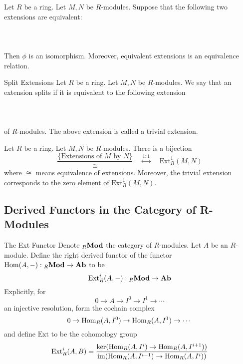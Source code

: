 \documentclass[a4paper]{article}
\begin{document}
\begin{prp}{}{} Let $R$ be a ring. Let $M,N$ be $R$-modules. Suppose that the following two extensions are equivalent: \\~\\
 \\~\\
Then $\phi$ is an isomorphism. Moreover, equivalent extensions is an equivalence relation. 
\end{prp}

\begin{defn}{Split Extensions}{} Let $R$ be a ring. Let $M,N$ be $R$-modules. We say that an extension splits if it is equivalent to the following extension \\~\\
 \\~\\
of $R$-modules. The above extension is called a trivial extension. 
\end{defn}

\begin{thm}{}{} Let $R$ be a ring. Let $M,N$ be $R$-modules. There is a bijection $$\frac{\{\text{Extensions of }M\text{ by }N\}}{\cong}\;\;\;\;\overset{1:1}{\longleftrightarrow}\;\;\;\;\text{Ext}_R^1(M,N)$$ where $\cong$ means equivalence of extensions. Moreover, the trivial extension corresponds to the zero element of $\text{Ext}_R^1(M,N)$. 
\end{thm}

\subsection{Derived Functors in the Category of R-Modules}
\begin{defn}{The Ext Functor}{} Denote $_R\bold{Mod}$ the category of $R$-modules. Let $A$ be an $R$-module. Define the right derived functor of the functor $\operatorname{Hom}(A,-):{_R\bold{Mod}}\to\bold{Ab}$ to be $$\text{Ext}_R^i(A,-):{_R\bold{Mod}}\to\bold{Ab}$$ Explicitly, for $$0\to A\to I^0\to I^1\to\cdots$$ an injective resolution, form the cochain complex $$0\to\operatorname{Hom}_R(A,I^0)\to\operatorname{Hom}_R(A,I^1)\to\cdots$$ and define $\text{Ext}$ to be the cohomology group $$\text{Ext}_R^i(A,B)=\frac{\ker(\operatorname{Hom}_R(A,I^i)\to\operatorname{Hom}_R(A,I^{i+1}))}{\operatorname{im}(\operatorname{Hom}_R(A,I^{i-1})\to\operatorname{Hom}_R(A,I^i))}$$
\end{defn}
\end{document}
